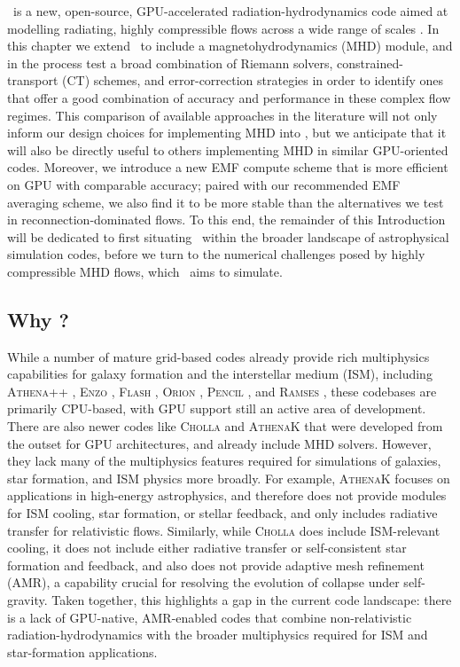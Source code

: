 \quokka~is a new, open-source, GPU-accelerated radiation-hydrodynamics code aimed at modelling radiating, highly compressible flows across a wide range of scales \citep[hereafter ]{Wibking22a}. In this chapter we extend \quokka~to include a magnetohydrodynamics (MHD) module, and in the process test a broad combination of Riemann solvers, constrained-transport (CT) schemes, and error-correction strategies in order to identify ones that offer a good combination of accuracy and performance in these complex flow regimes. This comparison of available approaches in the literature will not only inform our design choices for implementing MHD into \quokka, but we anticipate that it will also be directly useful to others implementing MHD in similar GPU-oriented codes. Moreover, we introduce a new EMF compute scheme that is more efficient on GPU with comparable accuracy; paired with our recommended EMF averaging scheme, we also find it to be more stable than the alternatives we test in reconnection-dominated flows. To this end, the remainder of this Introduction will be dedicated to first situating \quokka~within the broader landscape of astrophysical simulation codes, before we turn to the numerical challenges posed by highly compressible MHD flows, which \quokka~aims to simulate.

\subsection{Why \quokka?}

While a number of mature grid-based codes already provide rich multiphysics capabilities for galaxy formation and the interstellar medium (ISM), including \textsc{Athena++} \citep{Stone20a}, \textsc{Enzo} \citep{Bryan14a}, \textsc{Flash} \citep{Fryxell00a}, \textsc{Orion} \citep{Li21b}, \textsc{Pencil} \citep{Brandenburg02a}, and \textsc{Ramses} \citep{Teyssier02a}, these codebases are primarily CPU-based, with GPU support still an active area of development. There are also newer codes like \textsc{Cholla} \citep{Schneider15a} and \textsc{AthenaK} \citep{Stone24a} that were developed from the outset for GPU architectures, and already include MHD solvers. However, they lack many of the multiphysics features required for simulations of galaxies, star formation, and ISM physics more broadly. For example, \textsc{AthenaK} focuses on applications in high-energy astrophysics, and therefore does not provide modules for ISM cooling, star formation, or stellar feedback, and only includes radiative transfer for relativistic flows. Similarly, while \textsc{Cholla} does include ISM-relevant cooling, it does not include either radiative transfer or self-consistent star formation and feedback, and also does not provide adaptive mesh refinement (AMR), a capability crucial for resolving the evolution of collapse under self-gravity. Taken together, this highlights a gap in the current code landscape: there is a lack of GPU-native, AMR-enabled codes that combine non-relativistic radiation-hydrodynamics with the broader multiphysics required for ISM and star-formation applications.

